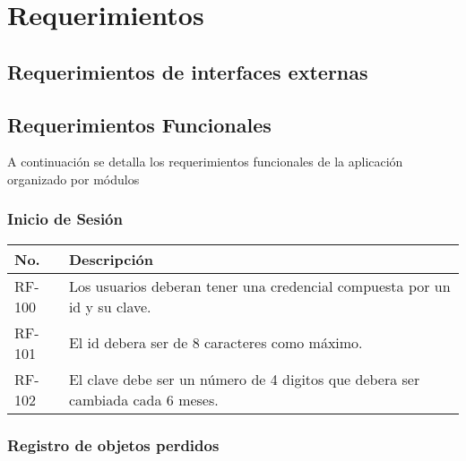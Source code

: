 \chapter{Requerimientos}

\section{Requerimientos de interfaces externas}

\section{Requerimientos Funcionales}

A continuación se detalla los requerimientos funcionales de la aplicación organizado por módulos

\subsection{Inicio de Sesión}


	\begin{table}[h!]	
		\begin{tabular}{ |p{2cm}|p{12cm}| }	\hline
			
			\rowcolor{gray!50}  \textbf{No.}  &  \textbf{Descripción} \\ \hline
			
			RF-100&Los usuarios deberan tener una credencial compuesta por un id y su clave.  \\	\hline
			
			RF-101&El id debera ser de 8 caracteres como máximo.  \\ \hline
			
			RF-102&El clave debe ser un número de 4 digitos que debera ser cambiada cada 6 meses.  \\ \hline	
		
		\end{tabular}
	\end{table}	


\subsection{Registro de objetos perdidos}

